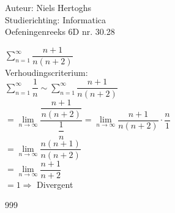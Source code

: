 \documentclass[a4paper]{article}
\begin{document}
	
\noindent \large Auteur: Niels Hertoghs \\
\noindent \large Studierichting:  Informatica\\
\noindent \large Oefeningenreeks 6D nr. 30.28\\


\medskip

\normalsize

$\displaystyle\sum\limits_{n = 1}^{\infty} \dfrac{n + 1}{n(n + 2)}$\\

Verhoudingscriterium:\\

$\displaystyle\sum\limits_{n = 1}^{\infty} \dfrac{1}{n} \sim  \displaystyle\sum\limits_{n = 1}^{\infty} \dfrac{n + 1}{n(n + 2)}$\\

$= \lim\limits_{n \rightarrow \infty} \dfrac{\dfrac{n + 1}{n(n + 2)}}{\dfrac{1}{n}} = \lim\limits_{n \rightarrow \infty} \dfrac{n+1}{n(n+2)} \cdot \dfrac{n}{1}$\\

$= \lim\limits_{n \rightarrow \infty} \dfrac{n(n+1)}{n(n+2)}$\\

$= \lim\limits_{n \rightarrow \infty} \dfrac{n+1}{n+2}$\\

$= 1 \Rightarrow$ Divergent
	
\begin{thebibliography}{999}
\end{thebibliography}
\end{document}
